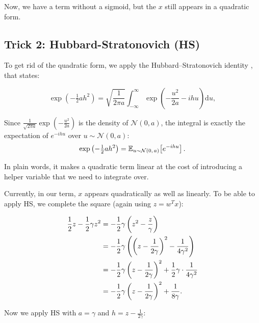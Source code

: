 Now, we have a term without a sigmoid, but the $x$ still appears in a quadratic form.

\subsection{Trick 2: Hubbard-Stratonovich (HS)}

To get rid of the quadratic form, we apply the Hubbard--Stratonovich identity \cite{stratonovich1957, hubbard1959}, that states:

\begin{equation}
    \exp \left( -\tfrac{1}{2} a h^2 \right) = \sqrt{  \frac{1}{2 \pi a}} \int_{-\infty}^{\infty} \exp \left(-\frac{u^2}{2a} -i h u\right) \mathrm{d}u,
\end{equation}

Since $\frac{1}{\sqrt{2\pi a}}\exp\!\left(-\frac{u^2}{2a}\right)$ is the density of $\mathcal{N}(0,a)$, the integral is
exactly the expectation of $e^{-ihu}$ over $u \sim \mathcal{N}(0,a)$:
\begin{equation}
    \exp \left( -\tfrac{1}{2} a h^2 \right) = \mathbb{E}_{u \sim \mathcal{N}(0,\,a)}\!\left[ e^{-ihu} \right].
\end{equation}

In plain words, it makes a quadratic term linear at the cost of introducing a helper variable that we need to integrate over.

Currently, in our term, $x$ appears quadratically as well as linearly. To be able to apply HS, we complete the square (again using $z = w^T x$):

\begin{align}
  \frac{1}{2}z - \frac{1}{2}\gamma z^2
  &= -\frac{1}{2}\gamma \left(z^2 - \frac{z}{\gamma}\right) \notag\\
  &= -\frac{1}{2}\gamma \left(\left(z - \frac{1}{2\gamma}\right)^{2} - \frac{1}{4\gamma^2}\right) \notag\\
  &= -\frac{1}{2}\gamma \left(z - \frac{1}{2\gamma}\right)^{2} + \frac{1}{2}\gamma \cdot \frac{1}{4\gamma^2} \notag\\
  &= -\frac{1}{2}\gamma \left(z - \frac{1}{2\gamma}\right)^{2} + \frac{1}{8\gamma}.
\end{align}

Now we apply HS with $a = \gamma$ and $h = z - \frac{1}{2\gamma}$:

